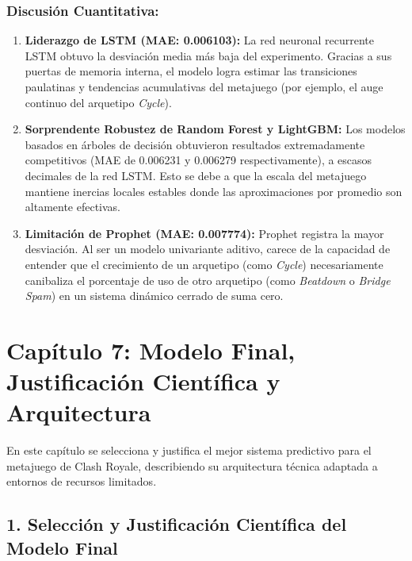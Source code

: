 \documentclass[
  spanish,
  12pt,
]{report}
\providecommand{\tightlist}{%
  \setlength{\itemsep}{0pt}\setlength{\parskip}{0pt}}
\begin{document}
\subsection{Discusión Cuantitativa:}\label{discusiuxf3n-cuantitativa}

\begin{enumerate}
\def\labelenumi{\arabic{enumi}.}
\tightlist
\item
  \textbf{Liderazgo de LSTM (MAE: 0.006103):} La red neuronal recurrente
  LSTM obtuvo la desviación media más baja del experimento. Gracias a
  sus puertas de memoria interna, el modelo logra estimar las
  transiciones paulatinas y tendencias acumulativas del metajuego (por
  ejemplo, el auge continuo del arquetipo \emph{Cycle}).
\item
  \textbf{Sorprendente Robustez de Random Forest y LightGBM:} Los
  modelos basados en árboles de decisión obtuvieron resultados
  extremadamente competitivos (MAE de 0.006231 y 0.006279
  respectivamente), a escasos decimales de la red LSTM. Esto se debe a
  que la escala del metajuego mantiene inercias locales estables donde
  las aproximaciones por promedio son altamente efectivas.
\item
  \textbf{Limitación de Prophet (MAE: 0.007774):} Prophet registra la
  mayor desviación. Al ser un modelo univariante aditivo, carece de la
  capacidad de entender que el crecimiento de un arquetipo (como
  \emph{Cycle}) necesariamente canibaliza el porcentaje de uso de otro
  arquetipo (como \emph{Beatdown} o \emph{Bridge Spam}) en un sistema
  dinámico cerrado de suma cero.
\end{enumerate}

\chapter{Capítulo 7: Modelo Final, Justificación Científica y
Arquitectura}\label{capuxedtulo-7-modelo-final-justificaciuxf3n-cientuxedfica-y-arquitectura}

En este capítulo se selecciona y justifica el mejor sistema predictivo
para el metajuego de Clash Royale, describiendo su arquitectura técnica
adaptada a entornos de recursos limitados.

\section{1. Selección y Justificación Científica del Modelo
Final}\label{selecciuxf3n-y-justificaciuxf3n-cientuxedfica-del-modelo-final}
\end{document}

